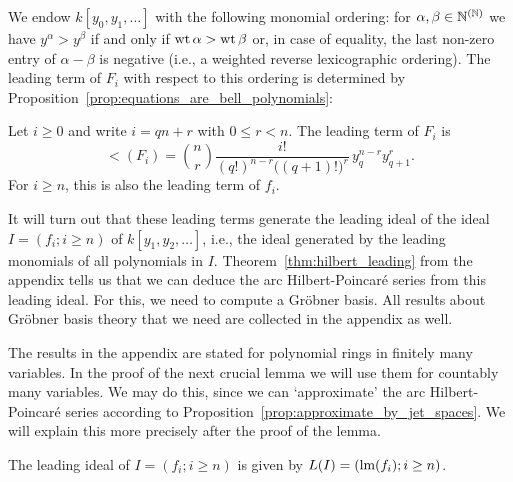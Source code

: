 We endow $k[y_0,y_1,\ldots]$ with the following monomial ordering: for
$\alpha, \beta \in \mathbb{N}^{(\mathbb{N})}$ we have $y^\alpha > y^\beta$ if and only
if $\textnormal{wt}\, \alpha > \textnormal{wt}\, \beta$ or, in case of equality, the last non-zero
entry of $\alpha - \beta$ is negative (i.e., a weighted reverse lexicographic ordering). The leading term of $F_i$
with respect to this ordering is determined by Proposition~\ref{prop:equations_are_bell_polynomials}:

\begin{Prop}\label{prop:leadingterm_Fi}
Let $i\geq 0$ and write $i = q n + r$ with $0\leq r < n$. The leading term of $F_i$ is 
$$\lt(F_i) = \binom{n}{r} \frac{i!}{(q!)^{n-r}\bigl((q+1)!\bigr)^r}\, y_q^{n-r} y_{q+1}^r. $$
For $i\geq n$, this is also the leading term of $f_i$.
\end{Prop}

It will turn out that these leading terms generate the leading ideal of the ideal $I=(f_i; i\geq n)$ of $k[y_1,y_2,\ldots]$, i.e., the ideal generated by the leading monomials of all polynomials in $I$. Theorem~\ref{thm:hilbert_leading} from the appendix tells us that we can deduce the arc Hilbert-Poincar\'e series from this leading ideal. For this, we need to compute a Gr\"obner basis. All results about Gr\"obner basis theory that we need are collected in the appendix as well.

\begin{Rem}
The results in the appendix are stated for polynomial rings in finitely many variables. In the proof of the next crucial lemma we will use them for countably many variables. We may do this, since we can `approximate' the arc Hilbert-Poincar\'e series according to Proposition~\ref{prop:approximate_by_jet_spaces}. We will explain this more precisely after the proof of the lemma.
\end{Rem}

\begin{Lem}\label{lem:gbbasis_nfold_point}
The leading ideal of $I=(f_i; i\geq n)$ is given by $L(I)=(\textnormal{lm}(f_i); i\geq
n)$. 
\end{Lem}


